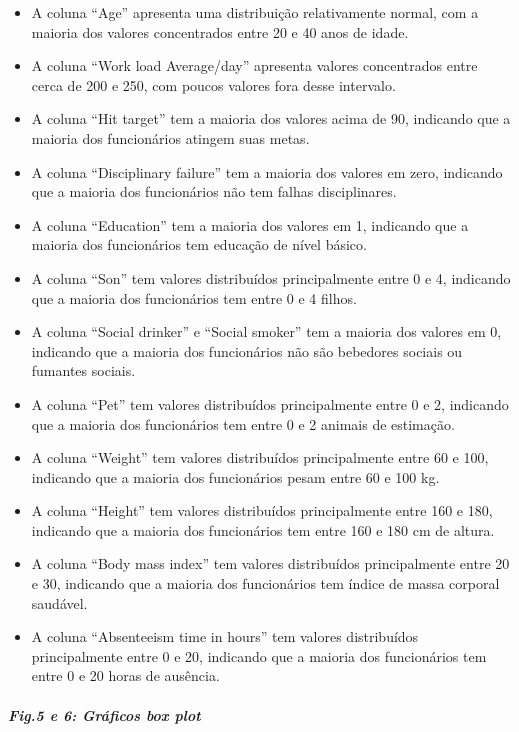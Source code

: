 \documentclass[11pt]{article}
\providecommand{\tightlist}{%
      \setlength{\itemsep}{0pt}\setlength{\parskip}{0pt}}
\begin{document}
    \begin{itemize}
\tightlist
\item
  A coluna ``Age'' apresenta uma distribuição relativamente normal, com
  a maioria dos valores concentrados entre 20 e 40 anos de idade.
\item
  A coluna ``Work load Average/day'' apresenta valores concentrados
  entre cerca de 200 e 250, com poucos valores fora desse intervalo.
\item
  A coluna ``Hit target'' tem a maioria dos valores acima de 90,
  indicando que a maioria dos funcionários atingem suas metas.
\item
  A coluna ``Disciplinary failure'' tem a maioria dos valores em zero,
  indicando que a maioria dos funcionários não tem falhas disciplinares.
\item
  A coluna ``Education'' tem a maioria dos valores em 1, indicando que a
  maioria dos funcionários tem educação de nível básico.
\item
  A coluna ``Son'' tem valores distribuídos principalmente entre 0 e 4,
  indicando que a maioria dos funcionários tem entre 0 e 4 filhos.
\item
  A coluna ``Social drinker'' e ``Social smoker'' tem a maioria dos
  valores em 0, indicando que a maioria dos funcionários não são
  bebedores sociais ou fumantes sociais.
\item
  A coluna ``Pet'' tem valores distribuídos principalmente entre 0 e 2,
  indicando que a maioria dos funcionários tem entre 0 e 2 animais de
  estimação.
\item
  A coluna ``Weight'' tem valores distribuídos principalmente entre 60 e
  100, indicando que a maioria dos funcionários pesam entre 60 e 100 kg.
\item
  A coluna ``Height'' tem valores distribuídos principalmente entre 160
  e 180, indicando que a maioria dos funcionários tem entre 160 e 180 cm
  de altura.
\item
  A coluna ``Body mass index'' tem valores distribuídos principalmente
  entre 20 e 30, indicando que a maioria dos funcionários tem índice de
  massa corporal saudável.
\item
  A coluna ``Absenteeism time in hours'' tem valores distribuídos
  principalmente entre 0 e 20, indicando que a maioria dos funcionários
  tem entre 0 e 20 horas de ausência.
\end{itemize}
\pagebreak
    \hypertarget{gruxe1ficos-box-plot}{%
\subparagraph{Fig.5 e 6: Gráficos box plot}\label{gruxe1ficos-box-plot}}
\end{document}
